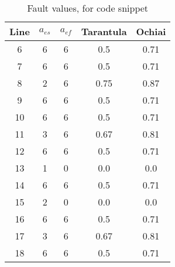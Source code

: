 

\begin{table}[!h]
\centering
\caption{Fault values, for code snippet}
\begin{tabular}{|c|c|c|c|c|}
\hline
Line & $a_{es}$ & $a_{ef}$ & Tarantula & Ochiai \\
\hline
6 & 6 & 6 & 0.5 & 0.71 \\
7 & 6 & 6 & 0.5 & 0.71 \\
8 & 2 & 6 & 0.75 & 0.87 \\
9 & 6 & 6 & 0.5 & 0.71 \\
10 & 6 & 6 & 0.5 & 0.71 \\
11 & 3 & 6 & 0.67 & 0.81 \\
12 & 6 & 6 & 0.5 & 0.71 \\
13 & 1 & 0 & 0.0 & 0.0 \\
14 & 6 & 6 & 0.5 & 0.71 \\
15 & 2 & 0 & 0.0 & 0.0 \\
16 & 6 & 6 & 0.5 & 0.71 \\
17 & 3 & 6 & 0.67 & 0.81 \\
18 & 6 & 6 & 0.5 & 0.71\\
\hline
\end{tabular}
\label{tab: sfl}
\end{table}